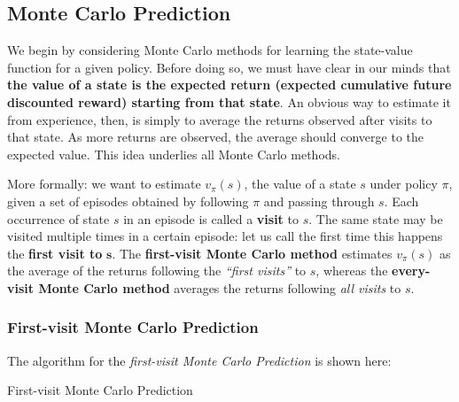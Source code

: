 \subsection{Monte Carlo Prediction}
We begin by considering Monte Carlo methods for learning the state-value function for a given policy. Before doing so, we must have clear in our minds that \textbf{the value of a state is the expected return (expected cumulative future discounted reward) starting from that state}. An obvious way to estimate it from experience, then, is simply to average the returns observed after visits to that state. As more returns are observed, the average should converge to the expected value. This idea underlies all Monte Carlo methods.

More formally: we want to estimate $v_\pi (s)$, the value of a state $s$ under policy $\pi$, given a set of episodes obtained by following $\pi$ and passing through $s$. Each occurrence of state $s$ in an episode is called a \textbf{visit} to $s$. The same state may be visited multiple times in a certain episode: let us call the first time this happens the \textbf{first visit to} $\boldsymbol{s}$. The \textbf{first-visit Monte Carlo method} estimates $v_\pi (s)$ as the average of the returns following the \textit{``first visits''} to $s$, whereas the \textbf{every-visit Monte Carlo method} averages the returns following \textit{all visits} to $s$.

\subsubsection{First-visit Monte Carlo Prediction}
The algorithm for the \textit{first-visit Monte Carlo Prediction} is shown here:

\begin{algorithm}[H]
\SetAlgoLined
{}

 \caption{First-visit Monte Carlo Prediction}
\end{algorithm}

